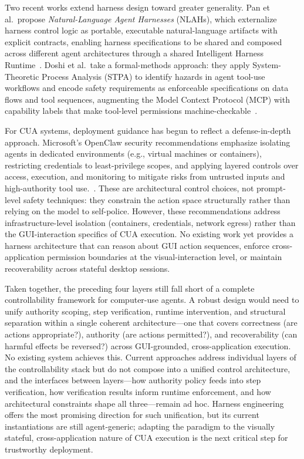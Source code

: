 Two recent works extend harness design toward greater generality. Pan et al.\ propose \emph{Natural-Language Agent Harnesses} (NLAHs), which externalize harness control logic as portable, executable natural-language artifacts with explicit contracts, enabling harness specifications to be shared and composed across different agent architectures through a shared Intelligent Harness Runtime~\cite{nlah2026}. Doshi et al.\ take a formal-methods approach: they apply System-Theoretic Process Analysis (STPA) to identify hazards in agent tool-use workflows and encode safety requirements as enforceable specifications on data flows and tool sequences, augmenting the Model Context Protocol (MCP) with capability labels that make tool-level permissions machine-checkable~\cite{verifiableSafeTool2026}.

For CUA systems, deployment guidance has begun to reflect a defense-in-depth approach. Microsoft’s OpenClaw security recommendations emphasize isolating agents in dedicated environments (e.g., virtual machines or containers), restricting credentials to least-privilege scopes, and applying layered controls over access, execution, and monitoring to mitigate risks from untrusted inputs and high-authority tool use.~\cite{msOpenClawSafety2026}. These are architectural control choices, not prompt-level safety techniques: they constrain the action space structurally rather than relying on the model to self-police. However, these recommendations address infrastructure-level isolation (containers, credentials, network egress) rather than the GUI-interaction specifics of CUA execution. No existing work yet provides a harness architecture that can reason about GUI action sequences, enforce cross-application permission boundaries at the visual-interaction level, or maintain recoverability across stateful desktop sessions.

Taken together, the preceding four layers still fall short of a complete controllability framework for computer-use agents. A robust design would need to unify authority scoping, step verification, runtime intervention, and structural separation within a single coherent architecture---one that covers correctness (are actions appropriate?), authority (are actions permitted?), and recoverability (can harmful effects be reversed?) across GUI-grounded, cross-application execution. No existing system achieves this. Current approaches address individual layers of the controllability stack but do not compose into a unified control architecture, and the interfaces between layers---how authority policy feeds into step verification, how verification results inform runtime enforcement, and how architectural constraints shape all three---remain ad hoc. Harness engineering offers the most promising direction for such unification, but its current instantiations are still agent-generic; adapting the paradigm to the visually stateful, cross-application nature of CUA execution is the next critical step for trustworthy deployment.

